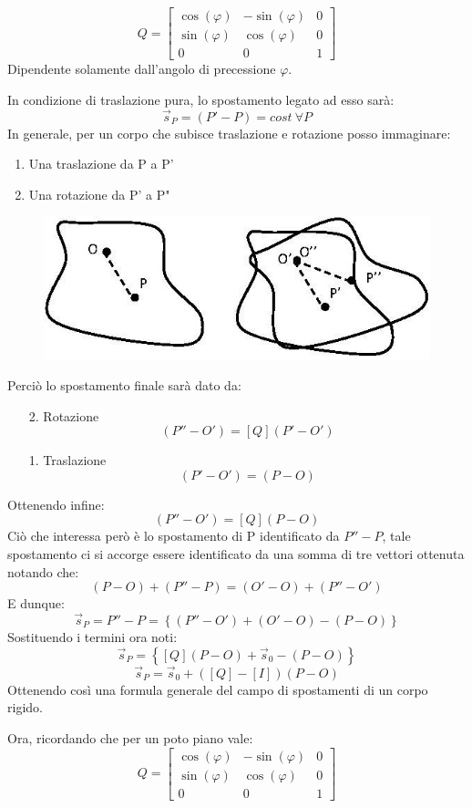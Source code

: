 \documentclass{article}
\begin{document}
\begin{adjustwidth}{2in}{}
\[
Q = \left[\begin{array}{ccc}
	\cos(\varphi) & -\sin(\varphi) & 0 \\
	\sin(\varphi) & \cos(\varphi) & 0 \\
	0 & 0 & 1
\end{array}
\right]
\]
Dipendente solamente dall'angolo di precessione $\varphi$. \newline

In condizione di traslazione pura, lo spostamento legato ad esso sarà: 
\[\vec{s}_P = (P' - P) = cost ~ \forall P\]
In generale, per un corpo che subisce traslazione e rotazione posso immaginare:
\begin{enumerate}
	\item Una traslazione da P a P' 
	\item Una rotazione da P' a P" 
\end{enumerate}
\begin{figure}[H]
	\centering
	\includegraphics[width=0.3\linewidth]{"immagini/1.PARTE1_Pagina_22"}
\end{figure}
Perciò lo spostamento finale sarà dato da: 
\begin{enumerate}
	\item[2.] Rotazione
	\[(P''-O') = [Q](P'-O')\]
	\item[1.] Traslazione
	\[(P'-O') = (P-O)\]
\end{enumerate}
Ottenendo infine:
\[(P''-O')=[Q](P-O)\]
Ciò che interessa però è lo spostamento di P identificato da $P'' - P$, tale spostamento ci si accorge essere identificato da una somma di tre vettori ottenuta notando che:
\[ (P-O) + (P'' - P) = (O' - O) + (P'' - O') \]
E dunque:
\[\vec{s}_P = P'' - P = \left\lbrace (P'' - O') + (O' - O) - (P-O)\right\rbrace  \]
Sostituendo i termini ora noti:
\[\vec{s}_P = \left\lbrace [Q](P-O) + \vec{s}_0 - (P-O)\right\rbrace  \]
\[\vec{s}_P = \vec{s}_0 + ([Q] - [I])(P-O)  \]
Ottenendo così una formula generale del campo di spostamenti di un corpo rigido. \newline

Ora, ricordando che per un poto piano vale: 
\[
Q = \left[\begin{array}{ccc}
	\cos(\varphi) & -\sin(\varphi) & 0 \\
	\sin(\varphi) & \cos(\varphi) & 0 \\
	0 & 0 & 1
\end{array}
\right]
\]


\end{adjustwidth}
\end{document}
